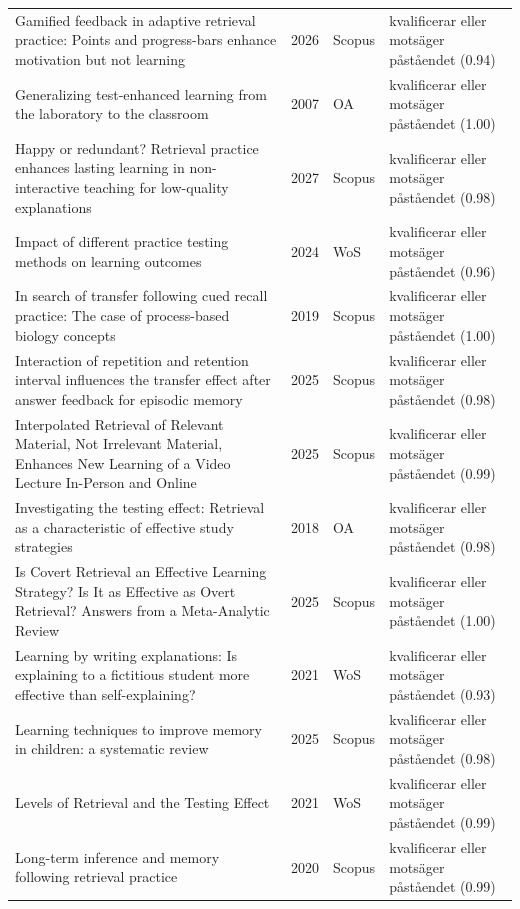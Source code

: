 \begin{longtable}{@{}%
  >{\raggedright\arraybackslash}p{}c%
  >{\raggedright\arraybackslash}p{}%
  >{\raggedright\arraybackslash}p{}@{}}
Gamified feedback in adaptive retrieval practice: Points and progress-bars enhance motivation but not learning & 2026 & Scopus & kvalificerar eller motsäger påståendet (0.94) \\
Generalizing test-enhanced learning from the laboratory to the classroom & 2007 & OA & kvalificerar eller motsäger påståendet (1.00) \\
Happy or redundant? Retrieval practice enhances lasting learning in non-interactive teaching for low-quality explanations & 2027 & Scopus & kvalificerar eller motsäger påståendet (0.98) \\
Impact of different practice testing methods on learning outcomes & 2024 & WoS & kvalificerar eller motsäger påståendet (0.96) \\
In search of transfer following cued recall practice: The case of process-based biology concepts & 2019 & Scopus & kvalificerar eller motsäger påståendet (1.00) \\
Interaction of repetition and retention interval influences the transfer effect after answer feedback for episodic memory & 2025 & Scopus & kvalificerar eller motsäger påståendet (0.98) \\
Interpolated Retrieval of Relevant Material, Not Irrelevant Material, Enhances New Learning of a Video Lecture In-Person and Online & 2025 & Scopus & kvalificerar eller motsäger påståendet (0.99) \\
Investigating the testing effect: Retrieval as a characteristic of effective study strategies & 2018 & OA & kvalificerar eller motsäger påståendet (0.98) \\
Is Covert Retrieval an Effective Learning Strategy? Is It as Effective as Overt Retrieval? Answers from a Meta-Analytic Review & 2025 & Scopus & kvalificerar eller motsäger påståendet (1.00) \\
Learning by writing explanations: Is explaining to a fictitious student more effective than self-explaining? & 2021 & WoS & kvalificerar eller motsäger påståendet (0.93) \\
Learning techniques to improve memory in children: a systematic review & 2025 & Scopus & kvalificerar eller motsäger påståendet (0.98) \\
Levels of Retrieval and the Testing Effect & 2021 & WoS & kvalificerar eller motsäger påståendet (0.99) \\
Long-term inference and memory following retrieval practice & 2020 & Scopus & kvalificerar eller motsäger påståendet (0.99) \\

\end{longtable}
